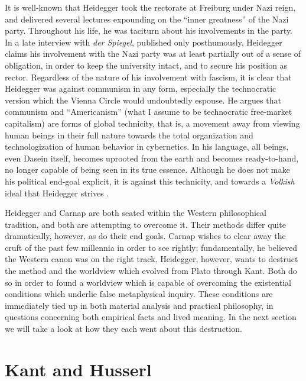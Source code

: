 \documentclass[leqno, 12pt]{turabian-researchpaper}
\begin{document}
	It is well-known that Heidegger took the rectorate at Freiburg under Nazi
	reign, and delivered several lectures expounding on the \enquote{inner greatness}
	of the Nazi party. Throughout his life, he was taciturn about his involvements
	in the party. In a late interview with \textit{der Spiegel}, published only posthumously,
	Heidegger claims his involvement with the Nazi party was at least partially
	out of a sense of obligation, in order to keep the university intact, and to
	secure his position as rector. Regardless of the nature of his involvement with
	fascism, it is clear that Heidegger was against communism in any form, especially
	the technocratic version which the Vienna Circle would undoubtedly espouse. He
	argues that communism and \enquote{Americanism} (what I assume to be
	technocratic free-market capitalism) are forms of global technicity, that is, a
	movement away from viewing human beings in their full nature towards the total
	organization and technologization of human behavior in cybernetics. In his
	language, all beings, even Dasein itself, becomes uprooted from the earth and becomes
	ready-to-hand, no longer capable of being seen in its true essence. Although he
	does not make his political end-goal explicit, it is against this technicity, and
	towards a \textit{Volkish} ideal that Heidegger strives \autocites{heidegger1981,heidegger2008c}.

	Heidegger and Carnap are both seated within the Western philosophical tradition,
	and both are attempting to overcome it. Their methods differ quite dramatically,
	however, as do their end goals. Carnap wishes to clear away the cruft of the
	past few millennia in order to see rightly; fundamentally, he believed the
	Western canon was on the right track. Heidegger, however, wants to destruct the
	method and the worldview which evolved from Plato through Kant. Both do so in
	order to found a worldview which is capable of overcoming the existential
	conditions which underlie false metaphysical inquiry. These conditions are immediately
	tied up in both material analysis and practical philosophy, in questions
	concerning both empirical facts and lived meaning. In the next section we will
	take a look at how they each went about this destruction.

	\section{Kant and Husserl}
\end{document}
